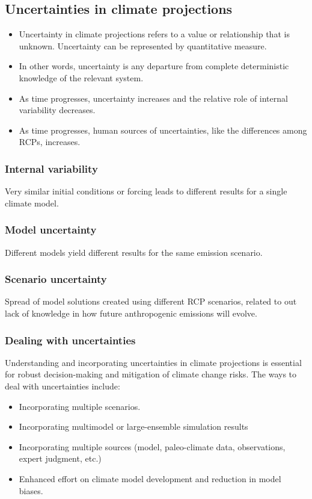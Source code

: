 \documentclass[11pt]{article}
\begin{document}
\subsection{Uncertainties in climate projections}
\label{sec:orgdb9564c}
\begin{itemize}
\item Uncertainty in climate projections refers to a value or relationship that is unknown. Uncertainty can be represented by quantitative measure.
\item In other words, uncertainty is any departure from complete deterministic knowledge of the relevant system.
\item As time progresses, uncertainty increases and the relative role of internal variability decreases.
\item As time progresses, human sources of uncertainties, like the differences among RCPs, increases.
\end{itemize}

\subsubsection{Internal variability}
\label{sec:orgb961aea}
Very similar initial conditions or forcing leads to different results for a single climate model.

\subsubsection{Model uncertainty}
\label{sec:org65ff72f}
Different models yield different results for the same emission scenario.

\subsubsection{Scenario uncertainty}
\label{sec:org19eb9eb}
Spread of model solutions created using different RCP scenarios, related to out lack of knowledge in how future anthropogenic emissions will evolve.

\subsubsection{Dealing with uncertainties}
\label{sec:org336df89}
Understanding and incorporating uncertainties in climate projections is essential for robust decision-making and mitigation of climate change risks. The ways to deal with uncertainties include:
\begin{itemize}
\item Incorporating multiple scenarios.
\item Incorporating multimodel or large-ensemble simulation results
\item Incorporating multiple sources (model, paleo-climate data, observations, expert judgment, etc.)
\item Enhanced effort on climate model development and reduction in model biases.
\end{itemize}
\end{document}
